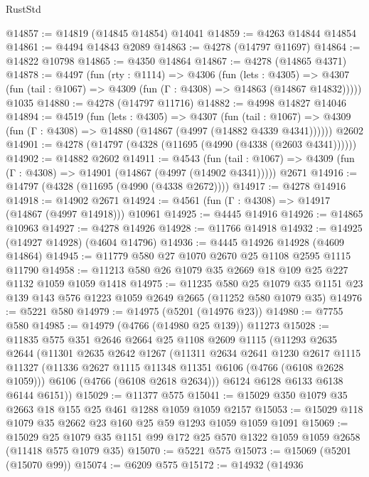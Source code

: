\begin{lexlean}{RustStd}
\begin{coremodule}
@14857 := @14819 (@14845 @14854) @14041
@14859 := @4263 @14844 @14854
@14861 := @4494 @14843 @2089
@14863 := @4278 (@14797 @11697)
@14864 := @14822 @10798
@14865 := @4350 @14864
@14867 := @4278 (@14865 @4371)
@14878 := @4497
    (fun (rty : @1114) =>
    @4306
      (fun (lets : @4305) =>
      @4307 (fun (tail : @1067) => @4309 (fun (Γ : @4308) => @14863 (@14867 @14832)))))
    @1035
@14880 := @4278 (@14797 @11716)
@14882 := @4998 @14827 @14046
@14894 := @4519
    (fun (lets : @4305) =>
    @4307
      (fun (tail : @1067) =>
      @4309 (fun (Γ : @4308) => @14880 (@14867 (@4997 (@14882 @4339 @4341))))))
    @2602
@14901 := @4278 (@14797 (@4328 (@11695 (@4990 (@4338 (@2603 @4341))))))
@14902 := @14882 @2602
@14911 := @4543
    (fun (tail : @1067) => @4309 (fun (Γ : @4308) => @14901 (@14867 (@4997 (@14902 @4341)))))
    @2671
@14916 := @14797 (@4328 (@11695 (@4990 (@4338 @2672))))
@14917 := @4278 @14916
@14918 := @14902 @2671
@14924 := @4561 (fun (Γ : @4308) => @14917 (@14867 (@4997 @14918))) @10961
@14925 := @4445 @14916
@14926 := @14865 @10963
@14927 := @4278 @14926
@14928 := @11766 @14918
@14932 := @14925 (@14927 @14928) (@4604 @14796)
@14936 := @4445 @14926 @14928 (@4609 @14864)
@14945 := @11779 @580 @27 @1070 @2670 @25 @1108 @2595 @1115 @11790
@14958 := @11213 @580 @26 @1079 @35 @2669 @18 @109 @25 @227 @1132 @1059 @1059 @1418
@14975 := @11235
    @580
    @25
    @1079
    @35
    @1151
    @23
    @139
    @143
    @576
    @1223
    @1059
    @2649
    @2665
    (@11252 @580 @1079 @35)
@14976 := @5221 @580
@14979 := @14975 (@5201 (@14976 @23))
@14980 := @7755 @580
@14985 := @14979 (@4766 (@14980 @25 @139)) @11273
@15028 := @11835
    @575
    @351
    @2646
    @2664
    @25
    @1108
    @2609
    @1115
    (@11293
      @2635
      @2644
      (@11301
        @2635
        @2642
        @1267
        (@11311
          @2634
          @2641
          @1230
          @2617
          @1115
          @11327
          (@11336 @2627 @1115 @11348 @11351 @6106 (@4766 (@6108 @2628 @1059)))
          @6106
          (@4766 (@6108 @2618 @2634)))
        @6124
        @6128
        @6133
        @6138
        @6144
        @6151))
@15029 := @11377 @575
@15041 := @15029 @350 @1079 @35 @2663 @18 @155 @25 @461 @1288 @1059 @1059 @2157
@15053 := @15029 @118 @1079 @35 @2662 @23 @160 @25 @59 @1293 @1059 @1059 @1091
@15069 := @15029
    @25
    @1079
    @35
    @1151
    @99
    @172
    @25
    @570
    @1322
    @1059
    @1059
    @2658
    (@11418 @575 @1079 @35)
@15070 := @5221 @575
@15073 := @15069 (@5201 (@15070 @99))
@15074 := @6209 @575
@15172 := @14932
    (@14936

\end{coremodule}
\end{lexlean}
